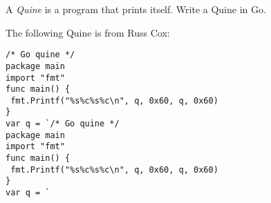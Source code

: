 \begin{Exercise}[title={Quine},difficulty=9]
A \emph{Quine} is a program that prints itself.
\label{ex:quine}
\Question\label{ex:quine q1} Write a Quine in Go.
\end{Exercise}

\begin{Answer}
\Question 
The following Quine is from Russ Cox:
\begin{lstlisting}
/* Go quine */
package main
import "fmt"
func main() {
 fmt.Printf("%s%c%s%c\n", q, 0x60, q, 0x60)
}
var q = `/* Go quine */
package main
import "fmt"
func main() {
 fmt.Printf("%s%c%s%c\n", q, 0x60, q, 0x60)
}
var q = `
\end{lstlisting}
\end{Answer}
